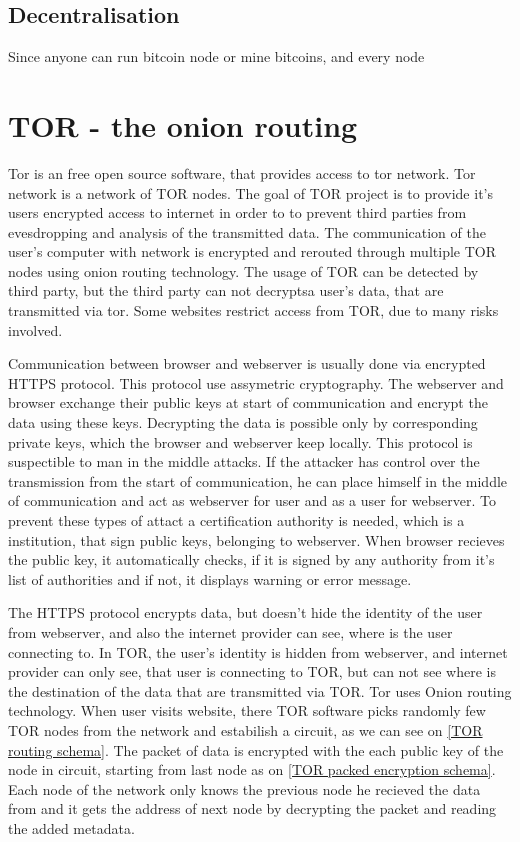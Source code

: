 \documentclass[
  digital, %
  table,   %
  lof,     %
  lot,     %
  oneside
]{fithesis3}
\begin{document}
\subsection{Decentralisation}

Since anyone can run bitcoin node or mine bitcoins, and every node

\section{TOR - the onion routing}

Tor is an free open source software, that provides access to tor network. Tor network is a network of TOR nodes.
The goal of TOR project is to provide it's users encrypted access to internet in order to to prevent third parties
from evesdropping and analysis of the transmitted data.
The communication of the user's computer with network is encrypted and rerouted through multiple TOR nodes using onion routing technology.
The usage of TOR can be detected by third party, but the third party can not decryptsa user's data, that are transmitted via tor.
Some websites restrict access from TOR, due to many risks involved.

Communication between browser and webserver is usually done via encrypted HTTPS protocol.
This protocol use assymetric cryptography. The webserver and browser exchange their public keys at start of communication
and encrypt the data using these keys. Decrypting the data is possible only by corresponding private keys,
which the browser and webserver keep locally. This protocol is suspectible to man in the middle attacks.
If the attacker has control over the transmission from the start of communication, he can place himself in the middle
 of communication and act as webserver for user and as a user for webserver. To prevent these types of attact
 a certification authority is needed, which is a institution, that sign public keys, belonging to webserver.
 When browser recieves the public key, it automatically checks, if it is signed by any authority from it's list of authorities
 and if not, it displays warning or error message.
 
The HTTPS protocol encrypts data, but doesn't hide the identity of the user from webserver,
 and also the internet provider can see, where is the user connecting to.
 In TOR, the user's identity is hidden from webserver, and internet provider can only see, that user is connecting to TOR,
 but can not see where is the destination of the data that are transmitted via TOR.
 Tor uses Onion routing technology. When user visits website, there TOR software picks randomly few TOR nodes from the network
 and estabilish a circuit, as we can see on \ref{TOR routing schema}. 
 The packet of data is encrypted with the each public key of the node in circuit, starting from last node as on \ref{TOR packed encryption schema}.
 Each node of the network only knows the previous node he recieved the data from and it gets the address 
 of next node by decrypting the packet and reading the added metadata.
 
\end{document}
